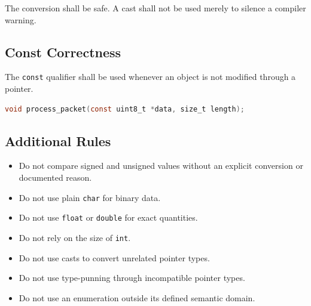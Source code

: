 The conversion shall be safe. A cast shall not be used merely to silence a compiler warning.

\subsection{Const Correctness}

The \texttt{const} qualifier shall be used whenever an object is not modified through a pointer.

\begin{lstlisting}[language=C]
void process_packet(const uint8_t *data, size_t length);
\end{lstlisting}

\subsection{Additional Rules}

\begin{itemize}
	\item Do not compare signed and unsigned values without an explicit conversion or documented reason.
	\item Do not use plain \texttt{char} for binary data.
	\item Do not use \texttt{float} or \texttt{double} for exact quantities.
	\item Do not rely on the size of \texttt{int}.
	\item Do not use casts to convert unrelated pointer types.
	\item Do not use type-punning through incompatible pointer types.
	\item Do not use an enumeration outside its defined semantic domain.
\end{itemize}
